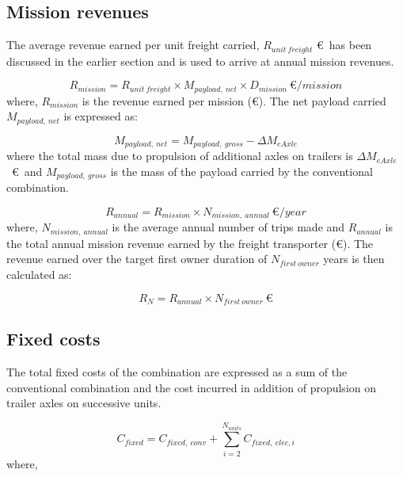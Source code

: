 \documentclass[ExampleMasters.tex]{subfiles}
\begin{document}
		\subsection{Mission revenues}

		The average revenue earned per unit freight carried, $R_{unit\ freight}$ \euro \ has been discussed in the earlier section and is used to arrive at annual mission revenues.

		\begin{equation}
			R_{mission} = R_{unit\ freight} \times M_{payload,\ net} \times D_{mission} \  \euro / mission
		\end{equation}
		where, $R_{mission}$ is the revenue earned per mission (\euro). The net payload carried $M_{payload,\ net}$ is expressed as:

		\begin{equation}
			M_{payload,\ net} = M_{payload,\ gross} - \Delta M_{eAxle}
		\end{equation}
		where the total mass due to propulsion of additional axles on trailers is $\Delta M_{eAxle}$ \ \euro \ and $M_{payload,\ gross}$ is the mass of the payload carried by the conventional combination.

		\begin{equation}
			R_{annual} = R_{mission} \times N_{mission,\ annual} \  \euro / year
		\end{equation}
		where, $N_{mission,\ annual}$ is the average annual number of trips made and $R_{annual}$ is the total annual mission revenue earned by the freight transporter (\euro). The revenue earned over the target first owner duration of $N_{first\ owner}$ years is then calculated as:

		\begin{equation}
			R_{N} = R_{annual} \times N_{first\ owner} \  \euro
		\end{equation}

		\subsection{Fixed costs}

			The total fixed costs of the combination are expressed as a sum of the conventional combination and the cost incurred in addition of propulsion on trailer axles on successive units.

			\begin{equation}
				C_{fixed} = C_{fixed,\ conv}+ \displaystyle \sum_{i=2}^{N_{units}} C_{fixed,\ elec, i}
			\end{equation}
			where,
\end{document}
